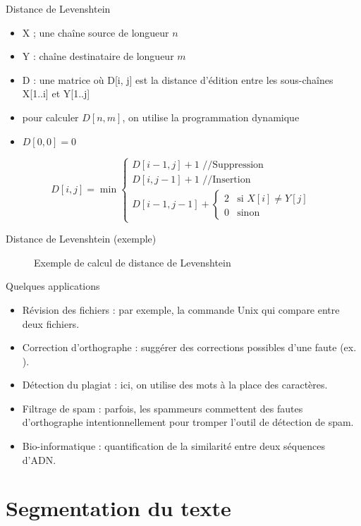 \documentclass{KodeBook}
\begin{document}
Distance de Levenshtein
\begin{itemize}
	\item X ; une chaîne source de longueur $n$
	\item Y : chaîne destinataire de longueur $m$
	\item D : une matrice où D[i, j] est la distance d'édition entre les sous-chaînes X[1..i] et Y[1..j]
	\item pour calculer $D[n, m]$, on utilise la programmation dynamique
	\item $D[0, 0] = 0$
\end{itemize}

\[
D[i, j] = \min 
\begin{cases}
D[i - 1, j] + 1 \text{ //Suppression}\\
D[i, j-1] + 1 \text{ //Insertion}\\
D[i-1, j-1] + \begin{cases}
2 & \text{si } X[i] \ne Y[j] \\
0 & \text{sinon}
\end{cases}
\end{cases}
\]

Distance de Levenshtein (exemple)
\begin{figure}
	\centering
	\caption{Exemple de calcul de distance de Levenshtein \cite{2019-jurafsky-martin}}
\end{figure}

Quelques applications
\begin{itemize}
	\item Révision des fichiers : par exemple, la commande Unix  qui compare entre deux fichiers.
	\item Correction d'orthographe : suggérer des corrections possibles d'une faute (ex. ).
	\item Détection du plagiat : ici, on utilise des mots à la place des caractères.
	\item Filtrage de spam : parfois, les spammeurs commettent des fautes d'orthographe intentionnellement pour tromper l'outil de détection de spam.
	\item Bio-informatique : quantification de la similarité entre deux séquences d'ADN.
\end{itemize}

\section{Segmentation du texte}
\end{document}
